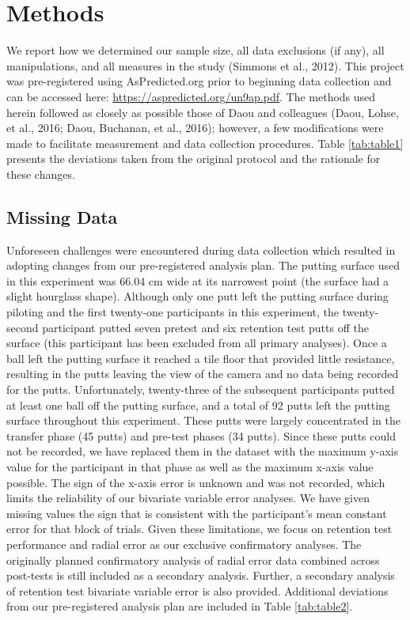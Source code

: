 \documentclass[
  english,
  man,floatsintext]{apa7}
\begin{document}
\hypertarget{methods}{%
\section{Methods}\label{methods}}

We report how we determined our sample size, all data exclusions (if any), all manipulations, and all measures in the study (Simmons et al., 2012). This project was pre-registered using AsPredicted.org prior to beginning data collection and can be accessed here: \url{https://aspredicted.org/un9ap.pdf}. The methods used herein followed as closely as possible those of Daou and colleagues (Daou, Lohse, et al., 2016; Daou, Buchanan, et al., 2016); however, a few modifications were made to facilitate measurement and data collection procedures. Table \ref{tab:table1} presents the deviations taken from the original protocol and the rationale for these changes.

\hypertarget{missing-data}{%
\subsection{Missing Data}\label{missing-data}}

Unforeseen challenges were encountered during data collection which resulted in adopting changes from our pre-registered analysis plan. The putting surface used in this experiment was 66.04 cm wide at its narrowest point (the surface had a slight hourglass shape). Although only one putt left the putting surface during piloting and the first twenty-one participants in this experiment, the twenty-second participant putted seven pretest and six retention test putts off the surface (this participant has been excluded from all primary analyses). Once a ball left the putting surface it reached a tile floor that provided little resistance, resulting in the putts leaving the view of the camera and no data being recorded for the putts. Unfortunately, twenty-three of the subsequent participants putted at least one ball off the putting surface, and a total of 92 putts left the putting surface throughout this experiment. These putts were largely concentrated in the transfer phase (45 putts) and pre-test phases (34 putts). Since these putts could not be recorded, we have replaced them in the dataset with the maximum y-axis value for the participant in that phase as well as the maximum x-axis value possible. The sign of the x-axis error is unknown and was not recorded, which limits the reliability of our bivariate variable error analyses. We have given missing values the sign that is consistent with the participant's mean constant error for that block of trials. Given these limitations, we focus on retention test performance and radial error as our exclusive confirmatory analyses. The originally planned confirmatory analysis of radial error data combined across post-tests is still included as a secondary analysis. Further, a secondary analysis of retention test bivariate variable error is also provided. Additional deviations from our pre-registered analysis plan are included in Table \ref{tab:table2}.
\end{document}
